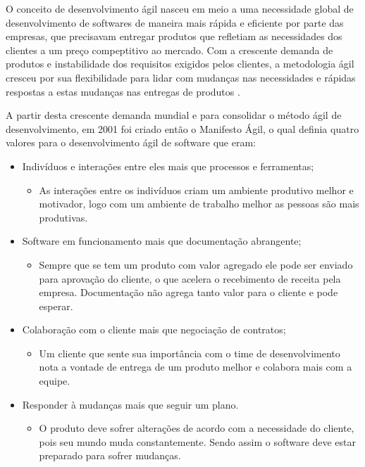 O conceito de desenvolvimento ágil nasceu em meio a uma necessidade global de desenvolvimento de softwares de maneira mais rápida e eficiente por parte das empresas, que precisavam entregar produtos que refletiam as necessidades dos clientes a um preço compeptitivo ao mercado. Com a crescente demanda de produtos e instabilidade dos requisitos exigidos pelos clientes, a metodologia ágil cresceu por sua flexibilidade para lidar com  mudanças nas necessidades e rápidas respostas a estas mudanças nas entregas de produtos \cite{Cheng1998}.

A partir desta crescente demanda mundial e para consolidar o método ágil de desenvolvimento, em 2001 foi criado então o Manifesto Ágil, o qual definia quatro valores para o desenvolvimento ágil de software que eram: 
	\begin{itemize}
		\item Indivíduos e interações entre eles mais que processos e ferramentas;
			\begin{itemize}
				\item As interações entre os indivíduos criam um ambiente produtivo melhor e motivador, logo com um ambiente de trabalho melhor as pessoas são mais produtivas.
			\end{itemize}
		\item Software em funcionamento mais que documentação abrangente;
			\begin{itemize}
				\item Sempre que se tem um produto com valor agregado ele pode ser enviado para aprovação do cliente, o que acelera o recebimento de receita pela empresa. Documentação não agrega tanto valor para o cliente e pode esperar.
			\end{itemize}
		\item Colaboração com o cliente mais que negociação de contratos;
			\begin{itemize}
				\item Um cliente que sente sua importância com o time de desenvolvimento nota a vontade de entrega de um produto melhor e colabora mais com a equipe.
			\end{itemize}
		\item Responder à mudanças mais que seguir um plano.
			\begin{itemize}
				\item O produto deve sofrer alterações de acordo com a necessidade do cliente, pois seu mundo muda constantemente. Sendo assim o software deve estar preparado para sofrer mudanças.
			\end{itemize}
	\end{itemize}

